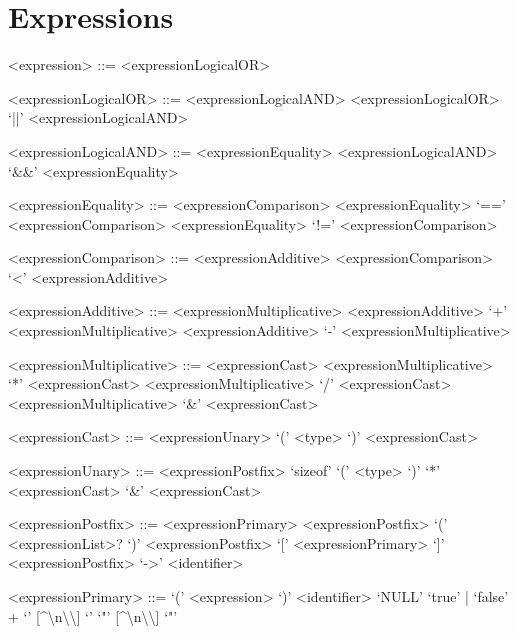 \section{Expressions}

\setlength{\grammarparsep}{20pt plus 1pt minus 1pt}
\setlength{\grammarindent}{10em}
\begin{grammar}

<expression> ::= <expressionLogicalOR>

<expressionLogicalOR> ::= <expressionLogicalAND>
\alt <expressionLogicalOR> `||' <expressionLogicalAND>

<expressionLogicalAND> ::= <expressionEquality>
\alt <expressionLogicalAND> `&&' <expressionEquality>

<expressionEquality> ::= <expressionComparison>
\alt <expressionEquality> `==' <expressionComparison>
\alt <expressionEquality> `!=' <expressionComparison>

<expressionComparison> ::= <expressionAdditive>
\alt <expressionComparison> `<' <expressionAdditive>

<expressionAdditive> ::= <expressionMultiplicative>
\alt <expressionAdditive> `+' <expressionMultiplicative>
\alt <expressionAdditive> `-' <expressionMultiplicative>

<expressionMultiplicative> ::= <expressionCast>
\alt <expressionMultiplicative> `*' <expressionCast>
\alt <expressionMultiplicative> `/' <expressionCast>
\alt <expressionMultiplicative> `&' <expressionCast>

<expressionCast> ::= <expressionUnary>
\alt `(' <type> `)' <expressionCast>

<expressionUnary> ::= <expressionPostfix>
\alt `sizeof' `(' <type> `)'
\alt `*' <expressionCast>
\alt `&' <expressionCast>

<expressionPostfix> ::= <expressionPrimary>
\alt <expressionPostfix> `(' <expressionList>? `)'
\alt <expressionPostfix> `[' <expressionPrimary> `]'
\alt <expressionPostfix> `->' <identifier>

<expressionPrimary> ::= `(' <expression> `)'
\alt <identifier>
\alt `NULL'
\alt `true' | `false'
\alt [0-9]+
\alt `\textquotesingle' [\^{}\textquotesingle\textbackslash n\textbackslash\textbackslash] `\textquotesingle'
\alt `"' [\^{}\textquotedbl\textbackslash n\textbackslash\textbackslash] `"'

\end{grammar}
